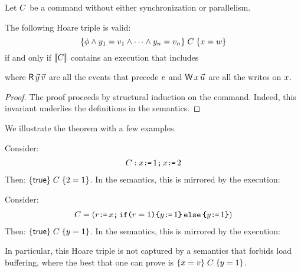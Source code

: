 \begin{theorem}
Let $C$ be a command without either synchronization or parallelism.

The following Hoare triple is valid:
\begin{displaymath}
  \{\phi\land y_1=v_1\land\cdots\land y_n=v_n\}\;C\;\{x=w\}  
\end{displaymath}
if and only if $\llbracket C\rrbracket$ contains an execution that includes
\begin{tikzdisplay}[node distance=1em]
\end{tikzdisplay}
where $\DR{\vec{\bLoc}}{\vec{\aVal}}$ are all the events that precede $e$ and
$\DW{\aLoc}{\vec{\dVal}}$ are all the writes on $x$.
\begin{proof}
The proof proceeds by structural induction on the command.  Indeed, this invariant underlies the definitions in the semantics.
\end{proof}
\end{theorem}

We illustrate the theorem with a few examples.

\begin{example}
Consider:
\begin{align*}
C:   x\texttt{:}\mkern-1mu\texttt{=}\, 1 \texttt{;}\, x \texttt{:}\mkern-1mu\texttt{=}\, 2
\end{align*}
Then: $\{\mathsf{true}\}\;C\;\{2=1\} $.  In the semantics, this is mirrored by the execution:
\begin{tikzdisplay}[node distance=1em]
\end{tikzdisplay}
\end{example}

\begin{example}
Consider:
\begin{align*}
C =  (r \texttt{:}\mkern-1mu\texttt{=}\, x \texttt{;}\, \texttt{if}\allowbreak\texttt{(}r=1\texttt{)} \allowbreak\texttt{\{} y \texttt{:}\mkern-1mu\texttt{=}\, 1 \texttt{\}}\,\allowbreak\texttt{else}\allowbreak\,\texttt{\{} y \texttt{:}\mkern-1mu\texttt{=}\, 1 \texttt{\}})
\end{align*}
Then: $\{\mathsf{true}\}\;C\;\{y=1\} $.  In the semantics, this is mirrored by the execution:
\begin{tikzdisplay}[node distance=1em]
\end{tikzdisplay}
In particular, this Hoare triple is not captured by a semantics that forbids load buffering, where the best that one can prove is
$\{x=v\}\;C\;\{y= 1\} $.
\end{example}
 
